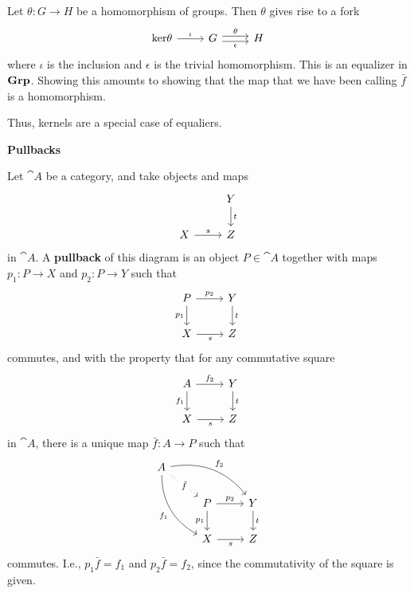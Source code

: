 \begin{example}
    Let $\theta:G\to H$ be a homomorphism of groups. Then $\theta$ gives rise to a fork
    \begin{equation*}
    \begin{tikzcd}
        \text{ker}\theta \arrow[r, "\iota"] & G \arrow[r, shift left, "\theta"] \arrow[r, shift right, "\epsilon"'] & H
    \end{tikzcd}
    \end{equation*}
    where $\iota$ is the inclusion and $\epsilon$ is the trivial homomorphism. This is an equalizer in $\mathbf{Grp}$. Showing this amounts to showing that the map that we have been calling $\bar{f}$ is a homomorphism.\par

Thus, kernels are a special case of equaliers.
\end{example}

\begin{center}
    \textbf{Pullbacks}
\end{center}

\begin{definition}
    Let $\cat{A}$ be a category, and take objects and maps
    \begin{equation*}
    \begin{tikzcd}
        & Y \arrow[d, "t"] \\
        X \arrow[r, "s"] & Z
    \end{tikzcd}
    \end{equation*}
    in $\cat{A}$. A \textbf{pullback} of this diagram is an object $P\in\cat{A}$ together with maps $p_1:P\to X$ and $p_2:P\to Y$ such that
    \begin{equation*}
    \begin{tikzcd}
        P \arrow[r, "p_2"] \arrow[d, "p_1"'] & Y \arrow[d, "t"] \\
        X \arrow[r, "s"'] & Z
    \end{tikzcd}
    \end{equation*}
    commutes, and with the property that for any commutative square
    \begin{equation*}
    \begin{tikzcd}
        A \arrow[r, "f_2"] \arrow[d, "f_1"'] & Y \arrow[d, "t"] \\
        X \arrow[r, "s"'] & Z
    \end{tikzcd}
    \end{equation*}
    in $\cat{A}$, there is a unique map $\bar{f}:A\to P$ such that
    \begin{equation*}
    \begin{tikzcd}
        A \arrow[dr, dotted, "\bar{f}"description] \arrow[drr, bend left, "f_2"] \arrow[ddr, bend right, "f_1"'] \\
        & P \arrow[r, "p_2"] \arrow[d, "p_1"'] & Y \arrow[d, "t"] \\
        & X \arrow[r, "s"'] & Z
    \end{tikzcd}
    \end{equation*}
    commutes. I.e., $p_1\bar{f}=f_1$ and $p_2\bar{f}=f_2$, since the commutativity of the square is given.
\end{definition}

